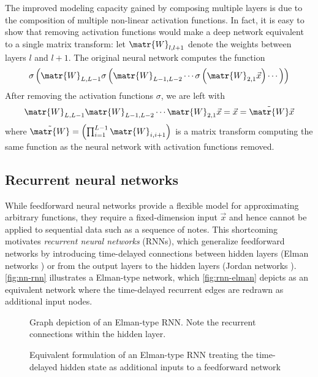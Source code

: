 The improved modeling capacity gained by composing multiple layers is due to
the composition of multiple non-linear activation functions.
In fact, it is easy to show that removing activation functions would make
a deep network equivalent to a single matrix transform: let $\matr{W}_{l,l+1}$
denote the weights between layers $l$ and $l+1$. The original neural network
computes the function
\begin{equation}
    \sigma\left(
        \matr{W}_{L,L-1} \sigma \left(
            \matr{W}_{L-1,L-2}\cdots \sigma \left(
                \matr{W}_{2,1} \vec{x}
            \right) \cdots
        \right)
    \right)
\end{equation}
After removing the activation functions $\sigma$, we are left with
\begin{equation}
    \matr{W}_{L,L-1} \matr{W}_{L-1,L-2}\cdots \matr{W}_{2,1} \vec{x}
    = \vec{x}
    = \tilde{\matr{W}} \vec{x}
\end{equation}
where $\tilde{\matr{W}} = \left(\prod_{i=1}^{L-1} \matr{W}_{i,i+1} \right)$
is a matrix transform computing the same function as the neural network with
activation functions removed.

\subsection{Recurrent neural networks}

While feedforward neural networks provide a flexible model for approximating
arbitrary functions, they require a fixed-dimension input $\vec{x}$ and hence
cannot be applied to sequential data such as a sequence of notes. This shortcoming
motivates \emph{recurrent neural networks} (RNNs), which generalize feedforward
networks by introducing time-delayed connections between hidden layers (Elman
networks \cite{elman1990finding}) or from the output layers to the hidden layers (Jordan
networks \cite{jordan1997serial}). \autoref{fig:nn-rnn} illustrates a Elman-type network, which
\autoref{fig:rnn-elman} depicts as an equivalent network where the time-delayed
recurrent edges are redrawn as additional input nodes.

\begin{figure}[htpb]
    \centering
    
    \caption{Graph depiction of an Elman-type RNN. Note the recurrent connections
    within the hidden layer.}
    \label{fig:nn-rnn}
\end{figure}

\begin{figure}[htpb]
    \centering
    
    \caption{Equivalent formulation of an Elman-type RNN treating the time-delayed hidden state
    as additional inputs to a feedforward network}
    \label{fig:rnn-elman}
\end{figure}



